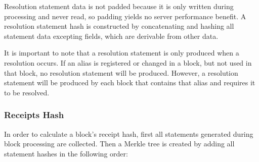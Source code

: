 \begin{figure}[H]
\end{figure}

Resolution statement data is not padded because it is only written during processing and never read, so padding yields no server performance benefit.
A resolution statement hash is constructed by concatenating and hashing all statement data excepting  fields, which are derivable from other data.

It is important to note that a resolution statement is only produced when a resolution occurs.
If an alias is registered or changed in a block, but not used in that block, no resolution statement will be produced.
However, a resolution statement will be produced by each block that contains that alias and requires it to be resolved.

\subsubsection{Receipts Hash}
\label{sec:blocks:receiptshash}

In order to calculate a block's receipt hash, first all statements generated during block processing are collected.
Then a Merkle tree is created by adding all statement hashes in the following order:

